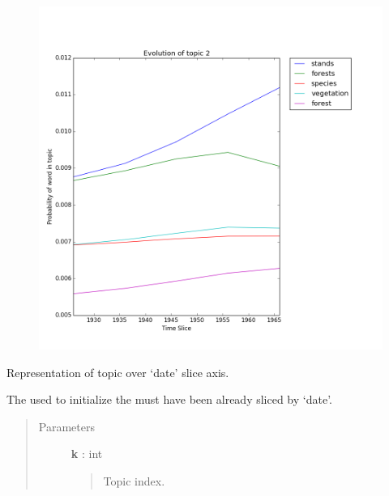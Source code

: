 \documentclass[letterpaper,10pt,english]{sphinxmanual}
\begin{document}
\begin{fulllineitems}
\begin{fulllineitems}
\begin{figure}[htbp]
\includegraphics{topic_2_evolution.png}
\end{figure}

\end{fulllineitems}


\begin{fulllineitems}
\label{tethne.model.managers.dtm:tethne.model.managers.dtm.DTMModelManager.topic_over_time}
Representation of topic  over `date' slice axis.

The {\hyperref[tethne.classes.corpus:tethne.classes.corpus.Corpus]{}} used to initialize the {\hyperref[tethne.model.managers.dtm:tethne.model.managers.dtm.DTMModelManager]{}}
must have been already sliced by `date'.
\begin{quote}\begin{description}
\item[{Parameters}] \leavevmode
\textbf{k} : int
\begin{quote}

Topic index.
\end{quote}


\end{description}
\end{quote}
\end{fulllineitems}
\end{fulllineitems}
\end{document}
